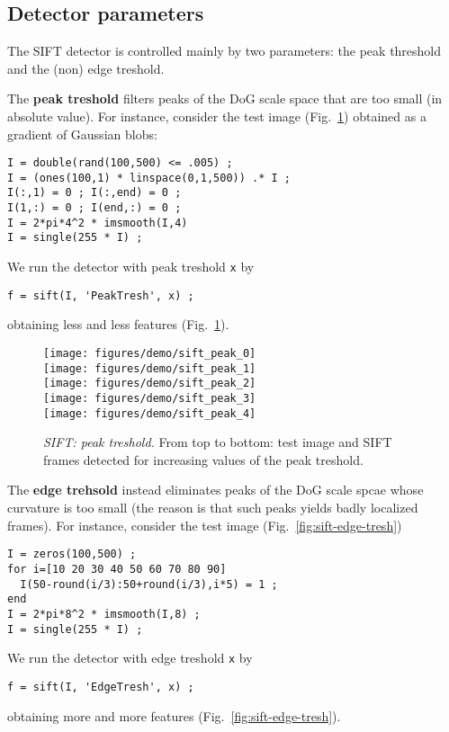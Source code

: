 \documentclass[9pt]{article}
\begin{document}
\subsection{Detector parameters}\label{sift.parameters}

The SIFT detector is controlled mainly by two parameters: the peak
threshold and the (non) edge treshold. 

The {\bf peak treshold} filters peaks of the DoG scale space that are
too small (in absolute value). For instance, consider the test image
(Fig.~\ref{fig:sift-peak-tresh}) obtained as a gradient of Gaussian
blobs:
\begin{verbatim}
I = double(rand(100,500) <= .005) ;
I = (ones(100,1) * linspace(0,1,500)) .* I ;
I(:,1) = 0 ; I(:,end) = 0 ;
I(1,:) = 0 ; I(end,:) = 0 ;
I = 2*pi*4^2 * imsmooth(I,4)
I = single(255 * I) ;
\end{verbatim}
We run the detector with peak treshold \verb$x$ by
\begin{verbatim}
f = sift(I, 'PeakTresh', x) ;
\end{verbatim}
obtaining less and less features (Fig.~\ref{fig:sift-peak-tresh}).

\begin{figure}
\begin{center}
\texttt{[image: figures/demo/sift\_peak\_0]}\\
\texttt{[image: figures/demo/sift\_peak\_1]}\\
\texttt{[image: figures/demo/sift\_peak\_2]}\\
\texttt{[image: figures/demo/sift\_peak\_3]}\\
\texttt{[image: figures/demo/sift\_peak\_4]}
\end{center}
\caption{{\em SIFT: peak treshold.} From top to bottom: test image and
  SIFT frames detected for increasing values of the peak treshold.}
\label{fig:sift-peak-tresh}
\end{figure}

The {\bf edge trehsold} instead eliminates peaks of the DoG scale
spcae whose curvature is too small (the reason is that such peaks
yields badly localized frames). For instance, consider the test image
(Fig.~\ref{fig:sift-edge-tresh})
\begin{verbatim}
I = zeros(100,500) ;
for i=[10 20 30 40 50 60 70 80 90]
  I(50-round(i/3):50+round(i/3),i*5) = 1 ;
end
I = 2*pi*8^2 * imsmooth(I,8) ;
I = single(255 * I) ;
\end{verbatim}
We run the detector with edge treshold \verb$x$ by
\begin{verbatim}
f = sift(I, 'EdgeTresh', x) ;
\end{verbatim}
obtaining more and more features (Fig.~\ref{fig:sift-edge-tresh}).
\end{document}
